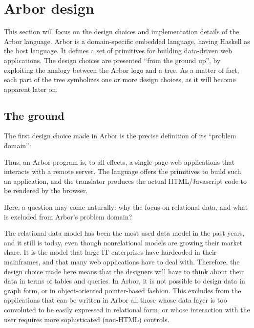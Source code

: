 \documentclass[12pt]{article} %
\newcommand{\ddwa}{data-driven web application}
\newcommand{\be}{back end}
\newcommand{\fe}{front end}
\newcommand{\dsel}{domain-specific embedded language}
\newcommand{\A}{Arbor}
\newcommand{\Hs}{Haskell}
\newcommand{\q}[1]{``#1''}
\newcounter{dccounter}
\newenvironment{dce}[3]
	{\refstepcounter{dccounter}\begin{tcolorbox}[colback=red!5!white,colframe=red!75!black,fonttitle=\bfseries,
size=small,righthand width=3cm,sidebyside,sidebyside align=center seam,lower separated=false,title=Design choice \thedccounter: \emph{#1}\label{#2}]}
	{\tcblower
     \texttt{[image: tree]}%
    \end{tcolorbox}}
\begin{document}
\section{\A{} design}\label{design}
This section will focus on the design choices and implementation details of the \A{} language. \A{} is a \dsel{}, having \Hs{} as the host language. It defines a set of primitives for building \ddwa{}s.
The design choices are presented \q{from the ground up}, by exploiting the analogy between the \A{} logo and a tree. As a matter of fact, each part of the tree symbolizes one or more design choices, as it will become apparent later on.

\subsection{The ground}\label{ground}
The first design choice made in \A{} is the precise definition of its \q{problem domain}:

Thus, an \A{} program is, to all effects, a single-page web applications that interacts with a remote server. The language offers the primitives to build such an application, and the translator produces the actual HTML/Javascript code to be rendered by the browser.

Here, a question may come naturally: why the focus on relational data, and what is excluded from \A{}'s problem domain?

The relational data model has been the most used data model in the past years, and it still is today, even though nonrelational models are growing their market share. It is the model that large IT enterprises have hardcoded in their mainframes, and that many web applications have to deal with. Therefore, the design choice made here means that the designers will have to think about their data in terms of tables and queries. In \A{}, it is not possible to design data in graph form, or in object-oriented pointer-based fashion. This excludes from the applications that can be written in \A{} all those whose data layer is too convoluted to be easily expressed in relational form, or whose interaction with the user requires more sophisticated (non-HTML) controls. 
\end{document}

